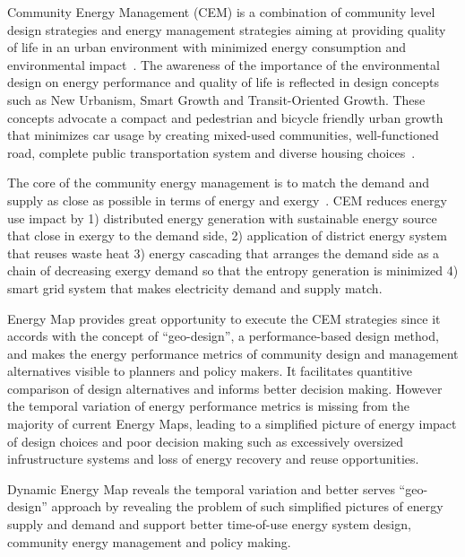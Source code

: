 \documentclass[hidelinks,12pt]{article}
\begin{document}
Community Energy Management (CEM) is a combination of community level
design strategies and energy management strategies aiming at providing
quality of life in an urban environment with minimized energy
consumption and environmental impact~\cite{Jaccard19971065}. The
awareness of the importance of the environmental design on energy
performance and quality of life is reflected in design concepts such
as New Urbanism, Smart Growth and Transit-Oriented Growth. These
concepts advocate a compact and pedestrian and bicycle friendly urban
growth that minimizes car usage by creating mixed-used communities,
well-functioned road, complete public transportation system and
diverse housing choices~\cite{smartGrowthWiki}.

The core of the community energy management is to match the demand and
supply as close as possible in terms of energy and
exergy~\cite{Dobbelsteen2013}. CEM reduces energy use impact by 1)
distributed energy generation with sustainable energy source that
close in exergy to the demand side, 2) application of district energy
system that reuses waste heat 3) energy cascading that arranges the
demand side as a chain of decreasing exergy demand so that the entropy
generation is minimized 4) smart grid system that makes electricity
demand and supply match.

Energy Map provides great opportunity to execute the CEM strategies
since it accords with the concept of ``geo-design'', a
performance-based design method, and makes the energy performance
metrics of community design and management alternatives visible to
planners and policy makers. It facilitates quantitive comparison of
design alternatives and informs better decision making. However the
temporal variation of energy performance metrics is missing from the
majority of current Energy Maps, leading to a simplified picture of
energy impact of design choices and poor decision making such as
excessively oversized infrustructure systems and loss of energy
recovery and reuse opportunities.

Dynamic Energy Map reveals the temporal variation and better serves
``geo-design'' approach by revealing the problem of such simplified
pictures of energy supply and demand and support better time-of-use
energy system design, community energy management and policy making.
\end{document}
